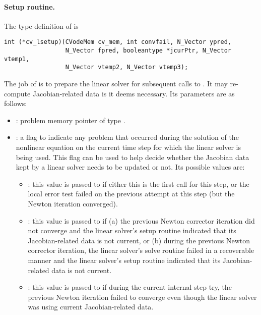\paragraph{Setup routine.} 
The type definition of  is
\begin{verbatim}
int (*cv_lsetup)(CVodeMem cv_mem, int convfail, N_Vector ypred,
                 N_Vector fpred, booleantype *jcurPtr, N_Vector vtemp1,
                 N_Vector vtemp2, N_Vector vtemp3); 
\end{verbatim}
The job of  is to prepare the linear solver for subsequent 
calls to . It may re-compute Jacobian-related data is it 
deems necessary. Its parameters are as follows:
\begin{itemize}
  
\item {}: problem memory pointer of type .
  
\item {}: a flag to indicate any problem that occurred during  
  the solution of the nonlinear equation on the current time step for which 
  the linear solver is being used. This flag can be used to help decide     
  whether the Jacobian data kept by a {\cvode} linear solver needs to be updated 
  or not. Its possible values are:
  \begin{itemize}
  \item {}: this value is passed to  if 
    either this is the first call for this step, or the local error test failed on the 
    previous attempt at this step (but the Newton iteration converged).
  \item {}: this value is passed to  if
    (a) the previous Newton corrector iteration did not converge and the linear solver's      
    setup routine indicated that its Jacobian-related data is not current,
    or                            
    (b) during the previous Newton corrector iteration, the linear solver's solve routine  
    failed in a recoverable manner and the linear solver's setup routine indicated that  
    its Jacobian-related data is not current.
  \item {}: this value is passed to  if 
    during the current internal step try, the previous Newton iteration failed to 
    converge even though the linear solver was using current Jacobian-related data.
  \end{itemize}
  

\end{itemize}
